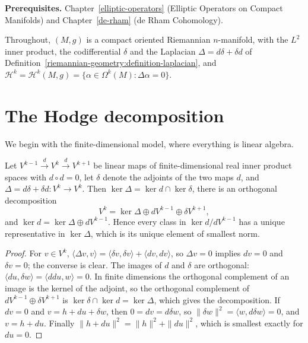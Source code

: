 \noindent\textbf{Prerequisites.} Chapter~\ref{elliptic-operators} (Elliptic Operators on Compact Manifolds) and
Chapter~\ref{de-rham} (de Rham Cohomology).

Throughout, $(M, g)$ is a compact oriented Riemannian $n$-manifold, with the $L^2$ inner product, the codifferential $\delta$ and the
Laplacian $\Delta = d\delta + \delta d$ of Definition~\ref{riemannian-geometry:definition-laplacian}, and
$\mathcal{H}^k = \mathcal{H}^k(M, g) = \{\alpha \in \Omega^k(M) : \Delta\alpha = 0\}$.

\section{The Hodge decomposition}\label{hodge-theorem:section-decomposition}

We begin with the finite-dimensional model, where everything is linear algebra.

\begin{lemma}\label{hodge-theorem:lemma-finite-dimensional}
Let $V^{k-1} \xrightarrow{d} V^k \xrightarrow{d} V^{k+1}$ be linear maps of finite-dimensional real inner product spaces with $d \circ d = 0$, let $\delta$ denote the adjoints of the two maps $d$, and
$\Delta = d\delta + \delta d \colon V^k \to V^k$. Then $\ker\Delta = \ker d \cap \ker\delta$, there is an orthogonal decomposition
\[
V^k = \ker\Delta \oplus dV^{k-1} \oplus \delta V^{k+1},
\]
and $\ker d = \ker\Delta \oplus dV^{k-1}$. Hence every class in $\ker d/dV^{k-1}$ has a unique representative in $\ker\Delta$, which is its unique element of smallest norm.
\end{lemma}

\begin{proof}
For $v \in V^k$, $\langle\Delta v, v\rangle = \langle\delta v, \delta v\rangle + \langle dv, dv\rangle$, so $\Delta v = 0$ implies $dv = 0$ and $\delta v = 0$; the converse is clear. The images of $d$ and $\delta$ are
orthogonal: $\langle du, \delta w\rangle = \langle ddu, w\rangle = 0$. In finite dimensions the orthogonal complement of an image is the kernel of the adjoint, so the orthogonal complement of
$dV^{k-1} \oplus \delta V^{k+1}$ is $\ker\delta \cap \ker d = \ker\Delta$, which gives the decomposition. If $dv = 0$ and $v = h + du + \delta w$, then $0 = dv = d\delta w$, so
$\|\delta w\|^2 = \langle w, d\delta w\rangle = 0$, and $v = h + du$. Finally $\|h + du\|^2 = \|h\|^2 + \|du\|^2$, which is smallest exactly for $du = 0$.
\end{proof}

